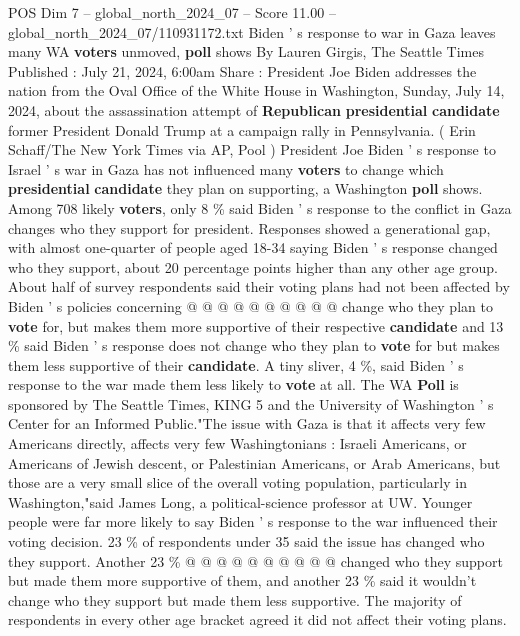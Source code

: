 \begin{textsample}{POS Dim 7 – global\_north\_2024\_07 – Score 11.00 – global\_north\_2024\_07/110931172.txt}  \label{ex:f7_pos_050}
Biden ' s response to war in Gaza leaves many WA \textbf{voters} unmoved, \textbf{poll} shows By Lauren Girgis, The Seattle Times Published : July 21, 2024, 6:00am Share : President Joe Biden addresses the nation from the Oval Office of the White House in Washington, Sunday, July 14, 2024, about the assassination attempt of \textbf{Republican} \textbf{presidential} \textbf{candidate} former President Donald Trump at a campaign rally in Pennsylvania. ( Erin Schaff/The New York Times via AP, Pool ) President Joe Biden ' s response to Israel ' s war in Gaza has not influenced many \textbf{voters} to change which \textbf{presidential} \textbf{candidate} they plan on supporting, a Washington \textbf{poll} shows.
Among 708 likely \textbf{voters}, only 8 \% said Biden ' s response to the conflict in Gaza changes who they support for president.
Responses showed a generational gap, with almost one-quarter of people aged 18-34 saying Biden ' s response changed who they support, about 20 percentage points higher than any other age group.
About half of survey respondents said their voting plans had not been affected by Biden ' s policies concerning @ @ @ @ @ @ @ @ @ @ change who they plan to \textbf{vote} for, but makes them more supportive of their respective \textbf{candidate} and 13 \% said Biden ' s response does not change who they plan to \textbf{vote} for but makes them less supportive of their \textbf{candidate}.
A tiny sliver, 4 \%, said Biden ' s response to the war made them less likely to \textbf{vote} at all.
The WA \textbf{Poll} is sponsored by The Seattle Times, KING 5 and the University of Washington ' s Center for an Informed Public."The issue with Gaza is that it affects very few Americans directly, affects very few Washingtonians : Israeli Americans, or Americans of Jewish descent, or Palestinian Americans, or Arab Americans, but those are a very small slice of the overall voting population, particularly in Washington,"said James Long, a political-science professor at UW.
Younger people were far more likely to say Biden ' s response to the war influenced their voting decision. 23 \% of respondents under 35 said the issue has changed who they support.
Another 23 \% @ @ @ @ @ @ @ @ @ @ changed who they support but made them more supportive of them, and another 23 \% said it wouldn't change who they support but made them less supportive.
The majority of respondents in every other age bracket agreed it did not affect their voting plans.

\end{textsample}
